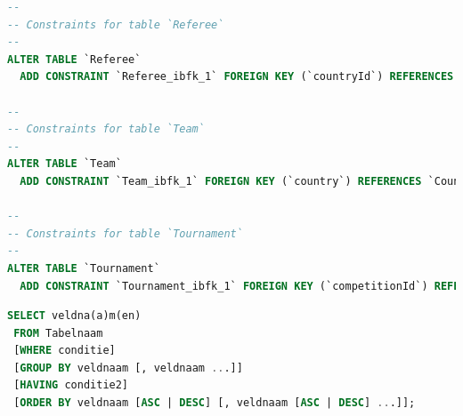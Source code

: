 \documentclass[11pt]{article}
\begin{document}
\begin{framed}
\begin{lstlisting}[language=sql]
--
-- Constraints for table `Referee`
--
ALTER TABLE `Referee`
  ADD CONSTRAINT `Referee_ibfk_1` FOREIGN KEY (`countryId`) REFERENCES `Country` (`id`);

--
-- Constraints for table `Team`
--
ALTER TABLE `Team`
  ADD CONSTRAINT `Team_ibfk_1` FOREIGN KEY (`country`) REFERENCES `Country` (`id`);

--
-- Constraints for table `Tournament`
--
ALTER TABLE `Tournament`
  ADD CONSTRAINT `Tournament_ibfk_1` FOREIGN KEY (`competitionId`) REFERENCES `Competition` (`id`);
     \end{lstlisting}
     \end{framed}








\begin{framed}
\begin{lstlisting}[language=sql]
SELECT veldna(a)m(en)
 FROM Tabelnaam
 [WHERE conditie]
 [GROUP BY veldnaam [, veldnaam ...]]
 [HAVING conditie2]
 [ORDER BY veldnaam [ASC | DESC] [, veldnaam [ASC | DESC] ...]];
\end{lstlisting}
\end{framed}
\end{document}
